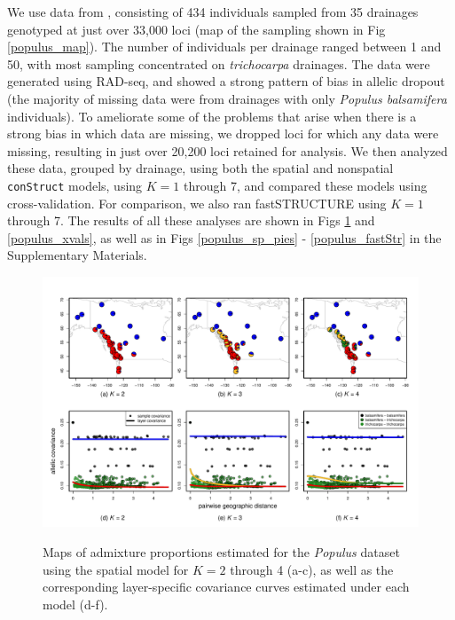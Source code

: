 \documentclass[10pt,letterpaper]{article}
\newcommand{\tri}{\textit{trichocarpa}}
\begin{document}
We use data from \cite{geraldes_etal_2014}, 
consisting of 434 individuals sampled from 35 drainages 
genotyped at just over 33,000 loci (map of the sampling shown in Fig \ref{populus_map}).
The number of individuals per drainage ranged between 1 and 50, 
with most sampling concentrated on \tri{} drainages.
The data were generated using RAD-seq, 
and showed a strong pattern of bias in allelic dropout 
(the majority of missing data were from drainages with only \textit{Populus balsamifera} individuals).
To ameliorate some of the problems that arise when there is a strong bias in which data are missing, 
we dropped loci for which any data were missing, 
resulting in just over 20,200 loci retained for analysis.  
We then analyzed these data, grouped by drainage, using both the spatial and nonspatial \texttt{conStruct} models, 
using $K = 1$ through 7,
and compared these models using cross-validation.
For comparison, we also ran fastSTRUCTURE \cite{fastStructure} 
using $K = 1$ through 7.
The results of all these analyses are shown in 
Figs \ref{populus_pies} and \ref{populus_xvals}, 
as well as in Figs \ref{populus_sp_pies} - \ref{populus_fastStr} in the Supplementary Materials.

\begin{figure}
	\centering
		{\includegraphics[width=\textwidth]{figs/populus/pop_sp_results.pdf}}
	\caption{
	Maps of admixture proportions estimated for the \textit{Populus} dataset 
	using the spatial model for $K=2$ through 4 (a-c), 
	as well as the corresponding layer-specific covariance curves estimated under each model (d-f).
    }\label{populus_pies}
\end{figure}
\end{document}
